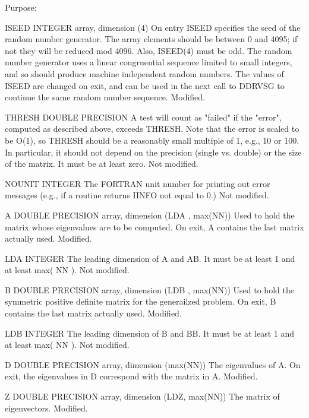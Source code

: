 \begin{DoxyParagraph}{Purpose\+: }
\begin{DoxyVerb}
  ISEED   INTEGER array, dimension (4)
          On entry ISEED specifies the seed of the random number
          generator. The array elements should be between 0 and 4095;
          if not they will be reduced mod 4096.  Also, ISEED(4) must
          be odd.  The random number generator uses a linear
          congruential sequence limited to small integers, and so
          should produce machine independent random numbers. The
          values of ISEED are changed on exit, and can be used in the
          next call to DDRVSG to continue the same random number
          sequence.
          Modified.

  THRESH  DOUBLE PRECISION
          A test will count as "failed" if the "error", computed as
          described above, exceeds THRESH.  Note that the error
          is scaled to be O(1), so THRESH should be a reasonably
          small multiple of 1, e.g., 10 or 100.  In particular,
          it should not depend on the precision (single vs. double)
          or the size of the matrix.  It must be at least zero.
          Not modified.

  NOUNIT  INTEGER
          The FORTRAN unit number for printing out error messages
          (e.g., if a routine returns IINFO not equal to 0.)
          Not modified.

  A       DOUBLE PRECISION array, dimension (LDA , max(NN))
          Used to hold the matrix whose eigenvalues are to be
          computed.  On exit, A contains the last matrix actually
          used.
          Modified.

  LDA     INTEGER
          The leading dimension of A and AB.  It must be at
          least 1 and at least max( NN ).
          Not modified.

  B       DOUBLE PRECISION array, dimension (LDB , max(NN))
          Used to hold the symmetric positive definite matrix for
          the generailzed problem.
          On exit, B contains the last matrix actually
          used.
          Modified.

  LDB     INTEGER
          The leading dimension of B and BB.  It must be at
          least 1 and at least max( NN ).
          Not modified.

  D       DOUBLE PRECISION array, dimension (max(NN))
          The eigenvalues of A. On exit, the eigenvalues in D
          correspond with the matrix in A.
          Modified.

  Z       DOUBLE PRECISION array, dimension (LDZ, max(NN))
          The matrix of eigenvectors.
          Modified.


\end{DoxyVerb}
\end{DoxyParagraph}
